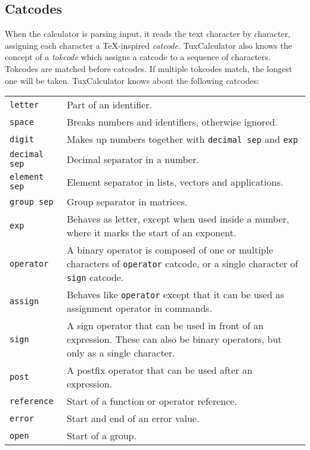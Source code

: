 \documentclass[10pt]{article}
\begin{document}
    \subsection{Catcodes}\label{subsec:catcodes}
    When the calculator is parsing input, it reads the text character by character, assigning each character a \TeX-inspired \textit{catcode}.
    TuxCalculator also knows the concept of a \textit{tokcode} which assigns a catcode to a sequence of characters.
    Tokcodes are matched before catcodes.
    If multiple tokcodes match, the longest one will be taken.
    TuxCalculator knows about the following catcodes:
    \begin{longtable}{p{}p{}}
        \verb|letter|          & Part of an identifier. \\
        \verb|space|           & Breaks numbers and identifiers, otherwise ignored. \\
        \verb|digit|           & Makes up numbers together with \verb|decimal sep| and \verb|exp| \\
        \verb|decimal sep|     & Decimal separator in a number. \\
        \verb|element sep|     & Element separator in lists, vectors and applications. \\
        \verb|group sep|       & Group separator in matrices. \\
        \verb|exp|             & Behaves as letter, except when used inside a number, where it marks the start of an exponent. \\
        \verb|operator|        & A binary operator is composed of one or multiple characters of \verb|operator| catcode, or a single character of \verb|sign| catcode. \\
        \verb|assign|          & Behaves like \verb|operator| except that it can be used as assignment operator in commands. \\
        \verb|sign|            & A sign operator that can be used in front of an expression. These can also be binary operators, but only as a single character. \\
        \verb|post|            & A postfix operator that can be used after an expression. \\
        \verb|reference|       & Start of a function or operator reference. \\
        \verb|error|           & Start and end of an error value. \\
        \verb|open|            & Start of a group. \\

\end{longtable}
\end{document}
